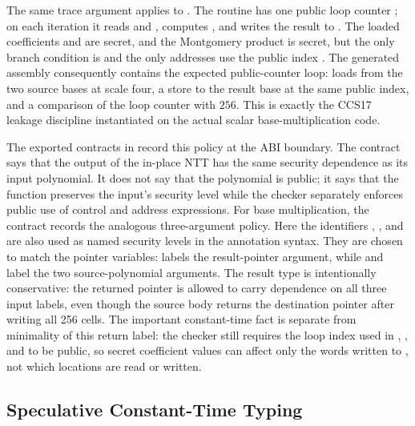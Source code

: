 The same trace argument applies to .  The routine has
one public loop counter ; on each iteration it reads  and
, computes , and writes the result to
.  The loaded coefficients  and  are secret, and
the Montgomery product is secret, but the only branch condition is
 and the only addresses use the public index .
The generated assembly consequently contains the expected public-counter loop:
loads from the two source bases at scale four, a store to the result base at
the same public index, and a comparison of the loop counter with \(256\).  This
is exactly the CCS17 leakage discipline instantiated on the actual scalar
base-multiplication code.

The exported contracts in  record this policy at the ABI
boundary.  The contract \jasm{\#[ct = "rp -> rp"]} says that the output of the
in-place NTT has the same security dependence as its input polynomial.  It
does not say that the polynomial is public; it says that the function preserves
the input's security level while the checker separately enforces public use of
control and address expressions.  For base multiplication, the contract
\jasm{\#[ct = "rp * ap * bp -> \{ap, bp, rp\}"]} records
the analogous three-argument policy.  Here the identifiers ,
, and  are also used as named security levels in the
\jasmin{} annotation syntax.  They are chosen to match the pointer variables:
 labels the result-pointer argument, while  and 
label the two source-polynomial arguments.  The result type
 is intentionally conservative: the returned pointer is
allowed to carry dependence on all three input labels, even though the source
body returns the destination pointer after writing all 256 cells.  The
important constant-time fact is separate from minimality of this return label:
the checker still requires the loop index used in , ,
and  to be public, so secret coefficient values can affect only the
words written to , not which locations are read or written.

\subsection{Speculative Constant-Time Typing}

